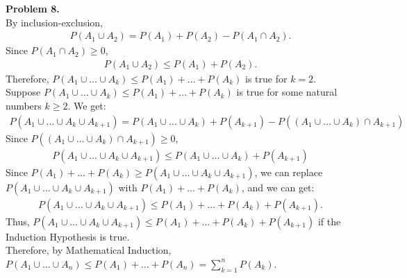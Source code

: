 \documentclass{article}
\begin{document}
\textbf{Problem 8.} \\
By inclusion-exclusion,
\begin{align}
    P(A_1 \cup A_2) = P(A_1) + P(A_2) - P(A_1 \cap A_2).
\end{align}
Since $P(A_1 \cap A_2) \ge 0$,
\begin{align}
    P(A_1 \cup A_2) \le P(A_1) + P(A_2).
\end{align}
Therefore, $P(A_1 \cup \dots \cup A_k) \le P(A_1) + \dots + P(A_k)$ is true for $k = 2$. \\
Suppose $P(A_1 \cup \dots \cup A_k) \le P(A_1) + \dots + P(A_k)$ is true for some natural numbers $k \ge 2$.
We get:
\begin{align}
    P(A_1 \cup \dots \cup A_k \cup A_{k+1}) = P(A_1 \cup \dots \cup A_k) + P(A_{k+1}) - P((A_1 \cup \dots \cup A_k) \cap A_{k+1}) 
\end{align}
Since $P((A_1 \cup \dots \cup A_k) \cap A_{k+1}) \ge 0$, 
\begin{align}
    P(A_1 \cup \dots \cup A_k \cup A_{k+1}) \le P(A_1 \cup \dots \cup A_k) + P(A_{k+1})
\end{align}
Since $P(A_1) + \dots + P(A_k) \ge P(A_1 \cup \dots \cup A_k \cup A_{k+1})$, we can replace $P(A_1 \cup \dots \cup A_k \cup A_{k+1})$ with $P(A_1) + \dots + P(A_k)$, and we can get:
\begin{align}
    P(A_1 \cup \dots \cup A_k \cup A_{k+1}) \le P(A_1) + \dots + P(A_k) + P(A_{k+1}).
\end{align}
Thus, $P(A_1 \cup \dots \cup A_k \cup A_{k+1}) \le P(A_1) + \dots + P(A_k) + P(A_{k+1})$ if the Induction Hypothesis is true. \\
Therefore, by Mathematical Induction, $P(A_1 \cup \dots \cup A_n) \le P(A_1) + \dots + P(A_n) = \sum_{k=1}^{n}P(A_k)$.
\end{document}
